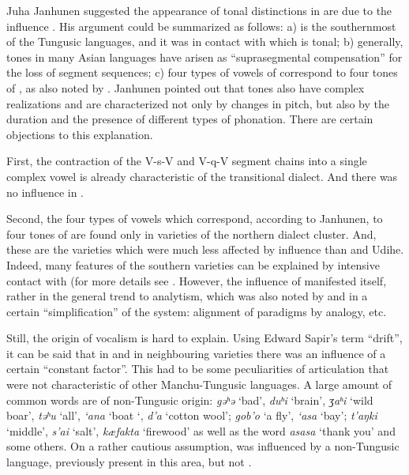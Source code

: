 \documentclass[output=paper,colorlinks,citecolor=brown]{langscibook}
\begin{document}
Juha Janhunen suggested the appearance of tonal distinctions in  are due to the  influence \citep{Janhunen1999}. His argument could be summarized as follows: a)  is the southernmost of the Tungusic languages, and it was in contact with  which is tonal; b) generally, tones in many Asian languages have arisen as “suprasegmental compensation” for the loss of segment sequences; c) four types of vowels of  correspond to four tones of , as also noted by \citet[104]{Radchenko1988}. Janhunen pointed out that  tones also have complex realizations and are characterized not only by changes in pitch, but also by the duration and the presence of different types of phonation. There are certain objections to this explanation. 

First, the contraction of the V-s-V and V-q-V segment chains into a single complex vowel is already characteristic of the  transitional dialect. And there was no  influence in .

Second, the four types of vowels which correspond, according to Janhunen, to four tones of  are found only in varieties of the northern dialect cluster. And, these are the varieties which were much less affected by  influence than  and  Udihe. Indeed, many features of the southern varieties can be explained by intensive contact with  (for more details see \citet{Perekhvalskaya2001}. However, the influence of  manifested itself, rather in the general trend to analytism, which was also noted by \citet[83--84]{Tsumagari2012} and in a certain “simplification” of the system: alignment of paradigms by analogy, etc.

Still, the origin of  vocalism is hard to explain. Using Edward Sapir’s term “drift”, it can be said that in  and in neighbouring  varieties there was an influence of a certain “constant factor”. This had to be some peculiarities of articulation that were not characteristic of other Manchu-Tungusic languages. A large amount of  common words are of non-Tungusic origin: \textit{g{ə}ʰ{ə}} ‘bad’, \textit{duʰi} ‘brain’, \textit{{ʒ}aʰi} ‘wild boar’, \textit{t{ə}ʰu} ‘all’, \textit{‘ana} ‘boat ‘, \textit{d’a} ‘cotton wool’; \textit{gob’o} ‘a fly’, \textit{‘asa} ‘bay’; \textit{t’aŋki} ‘middle’, \textit{s’ai} ‘salt’, \textit{kæfakta} ‘firewood’ as well as the word \textit{asasa} ‘thank you’ and some others. On a rather cautious assumption,  was influenced by a non-Tungusic language, previously present in this area, but not .
\end{document}
